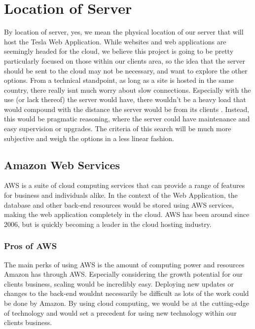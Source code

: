 \documentclass[onecolumn, draftclsnofoot,10pt, compsoc]{IEEEtran}
\begin{document}
\section{Location of Server}
By location of server, yes, we mean the physical location of our server that will host the Tesla Web Application. While websites and web applications are seemingly headed for the cloud, we believe this project is going to be pretty particularly focused on those within our client\textquotesingle s area, so the idea that the server should be sent to the cloud may not be necessary, and want to explore the other options. From a technical standpoint, as long as a site is hosted in the same country, there really isn\textquotesingle t much worry about slow connections. Especially with the use (or lack thereof) the server would have, there wouldn’t be a heavy load that would compound with the distance the server would be from its clients \cite{goran_2016}. Instead, this would be pragmatic reasoning, where the server could have maintenance and easy supervision or upgrades. The criteria of this search will be much more subjective and weigh the options in a less linear fashion. 

\subsection{Amazon Web Services}
AWS is a suite of cloud computing services that can provide a range of features for business and individuals alike. In the context of the Web Application, the database and other back-end resources would be stored using AWS services, making the web application completely in the cloud. AWS has been around since 2006, but is quickly becoming a leader in the cloud hosting industry. \cite{aws}

\subsubsection{Pros of AWS}
The main perks of using AWS is the amount of computing power and resources Amazon has through AWS. Especially considering the growth potential for our client\textquotesingle s business, scaling would be incredibly easy. Deploying new updates or changes to the back-end wouldn\textquotesingle t necessarily be difficult as lots of the work could be done by Amazon. By using cloud computing, we would be at the cutting-edge of technology and would set a precedent for using new technology within our client\textquotesingle s business. 
\end{document}
